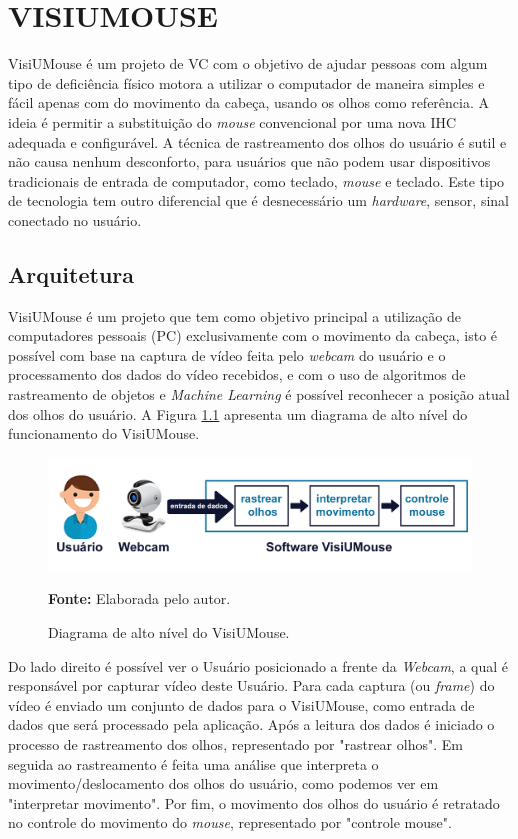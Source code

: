\chapter{VISIUMOUSE}\label{CAP4}
VisiUMouse é um projeto de VC com o objetivo de ajudar pessoas com algum tipo de deficiência físico motora a utilizar o computador de maneira simples e fácil apenas com do movimento da cabeça, usando os olhos como referência. A ideia é permitir a substituição do \textit{mouse} convencional por uma nova IHC adequada e configurável. A técnica de  rastreamento dos olhos do usuário é sutil e não causa nenhum desconforto, para usuários que não podem usar dispositivos tradicionais de entrada de computador, como teclado, \textit{mouse} e teclado. Este tipo de tecnologia tem outro diferencial que é desnecessário um \textit{hardware}, sensor, sinal conectado no usuário.

\section{Arquitetura}\label{Sub:funcionamento-visiumouse}
VisiUMouse é um projeto que tem como objetivo principal a utilização de computadores pessoais (PC) exclusivamente com o movimento da cabeça, isto é possível com base na captura de vídeo feita pelo \textit{webcam} do usuário e o processamento dos dados do vídeo recebidos, e com o uso de algoritmos de rastreamento de objetos e \textit{Machine Learning} é possível reconhecer a posição atual dos olhos do usuário. A Figura \ref{fig:projeto-diagrama-alto-nivel} apresenta um diagrama de alto nível do funcionamento do VisiUMouse. 

\begin{figure}[htbp]
\centering
\caption{Diagrama de alto nível do VisiUMouse.}
\includegraphics[scale=.23]{img/projeto-diagrama-alto-nivel.png}

{\fontsize{11}{11}\selectfont \textbf{Fonte:} Elaborada pelo autor.}
\label{fig:projeto-diagrama-alto-nivel}
\end{figure}


Do lado direito é possível ver o Usuário posicionado a frente da \textit{Webcam}, a qual é responsável por capturar vídeo deste Usuário. Para cada captura (ou \textit{frame}) do vídeo é enviado um conjunto de dados para o VisiUMouse, como entrada de dados que será processado pela aplicação. Após a leitura dos dados é iniciado o processo de rastreamento dos olhos, representado por "rastrear olhos". Em seguida ao rastreamento é feita uma análise que interpreta o movimento/deslocamento dos olhos do usuário, como podemos ver em "interpretar movimento". Por fim, o movimento dos olhos do usuário é retratado no controle do movimento do \textit{mouse}, representado por "controle mouse".


